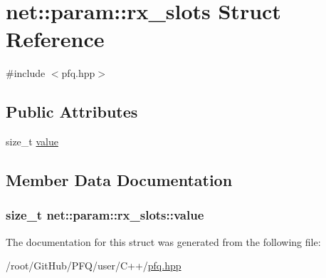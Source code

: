 \hypertarget{structnet_1_1param_1_1rx__slots}{\section{net\-:\-:param\-:\-:rx\-\_\-slots Struct Reference}
\label{structnet_1_1param_1_1rx__slots}
}


{\ttfamily \#include $<$pfq.\-hpp$>$}

\subsection*{Public Attributes}
\begin{DoxyCompactItemize}
\item 
size\-\_\-t \hyperlink{structnet_1_1param_1_1rx__slots_a7faa81257d9e7f5d55d33e5893f238b8}{value}
\end{DoxyCompactItemize}


\subsection{Member Data Documentation}
\hypertarget{structnet_1_1param_1_1rx__slots_a7faa81257d9e7f5d55d33e5893f238b8}{
\subsubsection[{value}]{\setlength{\rightskip}{0pt plus 5cm}size\-\_\-t net\-::param\-::rx\-\_\-slots\-::value}}\label{structnet_1_1param_1_1rx__slots_a7faa81257d9e7f5d55d33e5893f238b8}


The documentation for this struct was generated from the following file\-:\begin{DoxyCompactItemize}
\item 
/root/\-Git\-Hub/\-P\-F\-Q/user/\-C++/\hyperlink{pfq_8hpp}{pfq.\-hpp}\end{DoxyCompactItemize}
